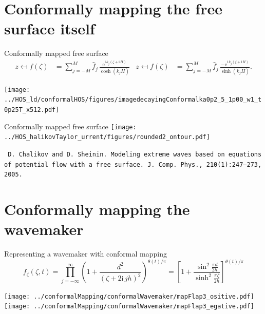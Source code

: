 \documentclass{sintefbeamer}
\newcommand{\mr}{\mathrm}
\newcommand{\ii}{\mr{i}\,}
\newcommand{\ee}{\mr{e}}
\renewcommand{\_}[1]{_\mr{#1}}
\newcommand{\z}{z}
\newcommand{\zz}{\zeta}
\newcommand{\h}{\hat}
\newcommand{\rbr}[1]{\left(#1\right)}
\newcommand{\sbr}[1]{\left[#1\right]}
\begin{document}

\section{Conformally mapping the free surface itself}

\begin{frame}{Conformally mapped free surface}
\centering
\vspace{-1cm}
\small
\begin{align*}
\z \mapsfrom f(\zz) &= \sum_{j=-M}^M \h f_j \,\frac{\ee^{\ii k_j(\zz+\ii H)}}{\cosh(k_j H)}
&
\z \mapsfrom f(\zz) &= \sum_{j=-M}^M \h f_j \,\frac{-\ee^{\ii k_j(\zz+\ii H)}}{\sinh(k_j H)}.
 \end{align*}%
\normalsize

\texttt{[image: ../HOS\_old/conformalHOS/figures/imagedecayingConformalka0p2\_M5\_h1p00\_Nw1\_dt0p25T\_nx512.pdf]}%
\end{frame}

\begin{frame}{Conformally mapped free surface}
	\centering
\texttt{[image: ../HOS\_ChalikovTaylor\_current/figures/rounded2\_contour.pdf]}%



\begin{flushleft}
	\texttt{ \scriptsize D. Chalikov and D. Sheinin. Modeling extreme waves based on equations of potential
		flow with a free surface. J.\ Comp. Phys., 210(1):247–273, 2005.}
\end{flushleft}

\end{frame}



\section{Conformally mapping the wavemaker}

\begin{frame}{Representing a wavemaker with conformal mapping}
	\centering
\vspace{-1cm}
	\begin{equation*}
f_\zz(\zz,t) = \prod_{j=-\infty}^\infty \rbr{1+\frac{d^2}{\rbr{\zz+2\ii j h}^2}}^{\theta(t)/\pi}
= \sbr{1+\frac{\sin^2\!\frac{\pi d}{2h}}{\sinh^2\!\frac{\pi \zz}{2h}}}^{\theta(t)/\pi}
\end{equation*}

\texttt{[image: ../conformalMapping/conformalWavemaker/mapFlap3\_positive.pdf]}%
\texttt{[image: ../conformalMapping/conformalWavemaker/mapFlap3\_negative.pdf]}%
\end{frame}
\end{document}
